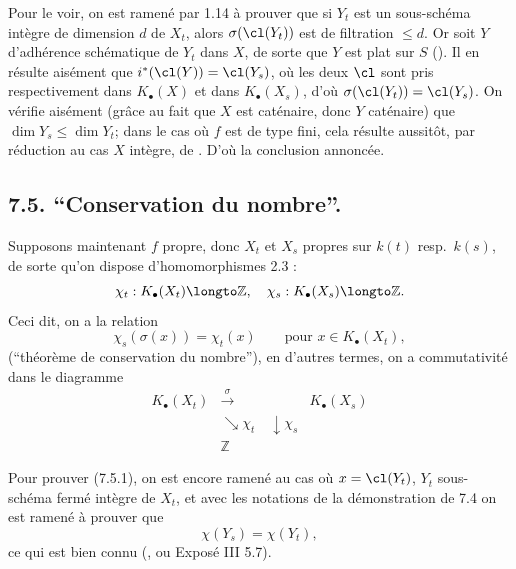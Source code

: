 Pour le voir, on est ramen\'e par 1.14 \`a prouver que si $Y_{t}$ est un sous-sch\'ema int\`egre de dimension $d$ de $X_{t}$, alors $\sigma(\cl(Y_{t}))$ est de filtration $\leqslant d$. Or soit $Y$ d'adh\'erence sch\'ematique de $Y_{t}$ dans $X$, de sorte que $Y$ est plat sur $S$ (). Il en r\'esulte ais\'ement que $i^{*}(\cl(Y)) = \cl(Y_{s})$, o\`u les deux $\cl$ sont pris respectivement dans $K_{\bullet}(X)$ et dans $K_{\bullet}(X_{s})$, d'o\`u $\sigma(\cl(Y_{t})) = \cl(Y_{s})$. On v\'erifie ais\'ement (gr\^ace au fait que $X$ est cat\'enaire, donc $Y$ cat\'enaire) que $\dim Y_{s} \leqslant \dim Y_{t}$; dans le cas o\`u $f$ est de type fini, cela r\'esulte aussit\^ot, par r\'eduction au cas $X$ int\`egre, de . D'o\`u la conclusion annonc\'ee.

\subsection*{7.5. ``Conservation du nombre''.}

Supposons maintenant $f$ propre, donc $X_{t}$ et $X_{s}$ propres sur $k(t)$ resp.\ $k(s)$, de sorte qu'on dispose d'homomorphismes 2.3 :
\[
\chi_{t} : K_{\bullet}(X_{t}) \longto \mathbb{Z}, \quad \chi_{s} : K_{\bullet}(X_{s}) \longto \mathbb{Z}.
\]
Ceci dit, on a la relation
\begin{equation}\label{eq:7.5.1}
\chi_{s}(\sigma(x)) = \chi_{t}(x) \qquad \text{pour } x \in K_{\bullet}(X_{t}),
\end{equation}
(``th\'eor\`eme de conservation du nombre''), en d'autres termes, on a commutativit\'e dans le diagramme
\begin{equation}\label{eq:7.5.2}
\begin{array}{ccc}
K_{\bullet}(X_{t}) & \xrightarrow{\,\sigma\,} & K_{\bullet}(X_{s}) \\
& \searrow{\scriptstyle \chi_{t}} \quad \downarrow{\scriptstyle \chi_{s}} & \\
& \mathbb{Z} &
\end{array}
\end{equation}

Pour prouver (7.5.1), on est encore ramen\'e au cas o\`u $x = \cl(Y_{t})$, $Y_{t}$ sous-sch\'ema ferm\'e int\`egre de $X_{t}$, et avec les notations de la d\'emonstration de 7.4 on est ramen\'e \`a prouver que
\[
\chi(Y_{s}) = \chi(Y_{t}),
\]
ce qui est bien connu (, ou Expos\'e III 5.7).

